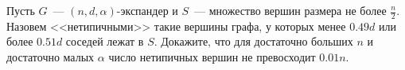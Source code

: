 Пусть $G$~--- $(n, d, \alpha)$-экспандер и $S$~--- множество вершин размера не более
$\frac{n}{2}$. Назовем <<нетипичными>> такие вершины графа, у которых менее $0.49 d$ или более $0.51 d$
соседей лежат в $S$. Докажите, что для достаточно больших $n$ и достаточно малых $\alpha$ число
нетипичных вершин не превосходит $0.01 n$.
